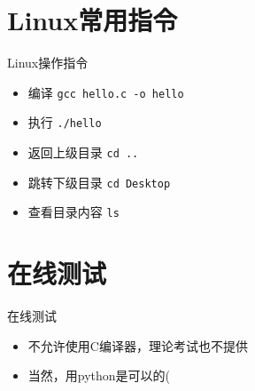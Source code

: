 \documentclass[UTF8]{ctexbeamer}
\begin{document}
\section{Linux常用指令}
\begin{frame}
\sectionpage
\end{frame}

\begin{frame}[fragile]{Linux操作指令}
\begin{itemize}
	\item 编译 \verb'gcc hello.c -o hello'
	\item 执行 \verb'./hello'
	\item 返回上级目录 \verb'cd ..'
	\item 跳转下级目录 \verb'cd Desktop'
	\item 查看目录内容 \verb'ls'
\end{itemize}
\end{frame}

\section{在线测试}
\begin{frame}
\sectionpage
\end{frame}

\begin{frame}{在线测试}
\begin{itemize}
	\item 不允许使用C编译器，理论考试也不提供
	\item 当然，用python是可以的(
\end{itemize}
\end{frame}
\end{document}
